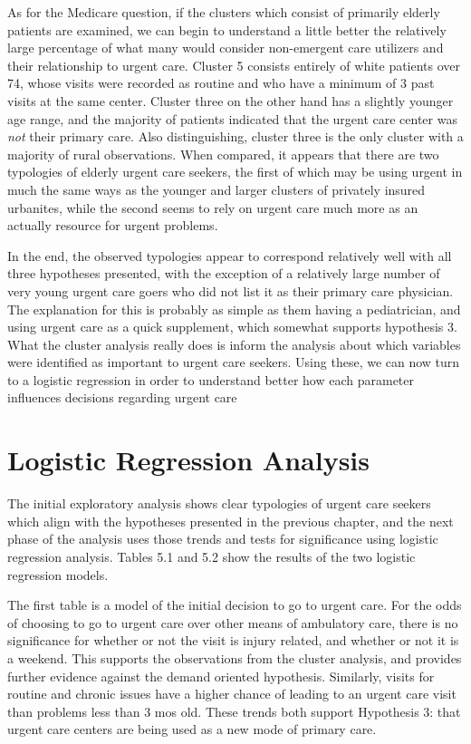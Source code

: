 \documentclass[12pt,twoside]{reedthesis}
\begin{document}
  As for the Medicare question, if the clusters which consist of primarily
  elderly patients are examined, we can begin to understand a little
  better the relatively large percentage of what many would consider
  non-emergent care utilizers and their relationship to urgent care.
  Cluster 5 consists entirely of white patients over 74, whose visits were
  recorded as routine and who have a minimum of 3 past visits at the same
  center. Cluster three on the other hand has a slightly younger age
  range, and the majority of patients indicated that the urgent care
  center was \emph{not} their primary care. Also distinguishing, cluster
  three is the only cluster with a majority of rural observations. When
  compared, it appears that there are two typologies of elderly urgent
  care seekers, the first of which may be using urgent in much the same
  ways as the younger and larger clusters of privately insured urbanites,
  while the second seems to rely on urgent care much more as an actually
  resource for urgent problems.
  
  In the end, the observed typologies appear to correspond relatively well
  with all three hypotheses presented, with the exception of a relatively
  large number of very young urgent care goers who did not list it as
  their primary care physician. The explanation for this is probably as
  simple as them having a pediatrician, and using urgent care as a quick
  supplement, which somewhat supports hypothesis 3. What the cluster
  analysis really does is inform the analysis about which variables were
  identified as important to urgent care seekers. Using these, we can now
  turn to a logistic regression in order to understand better how each
  parameter influences decisions regarding urgent care
  
  \section*{Logistic Regression
  Analysis}\label{logistic-regression-analysis}
  
  The initial exploratory analysis shows clear typologies of urgent care
  seekers which align with the hypotheses presented in the previous
  chapter, and the next phase of the analysis uses those trends and tests
  for significance using logistic regression analysis. Tables 5.1 and 5.2
  show the results of the two logistic regression models.
  
  The first table is a model of the initial decision to go to urgent care.
  For the odds of choosing to go to urgent care over other means of
  ambulatory care, there is no significance for whether or not the visit
  is injury related, and whether or not it is a weekend. This supports the
  observations from the cluster analysis, and provides further evidence
  against the demand oriented hypothesis. Similarly, visits for routine
  and chronic issues have a higher chance of leading to an urgent care
  visit than problems less than 3 mos old. These trends both support
  Hypothesis 3: that urgent care centers are being used as a new mode of
  primary care.
  
\end{document}
